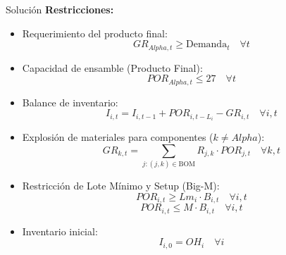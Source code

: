 \documentclass[11pt, a4paper]{article}
\begin{document}
\begin{ejercicio}{Solución}
  \textbf{Restricciones:}
  \begin{itemize}
    \item Requerimiento del producto final:
      \begin{equation}
        GR_{Alpha,t} \ge \text{Demanda}_t \quad \forall t
      \end{equation}
    \item Capacidad de ensamble (Producto Final):
      \begin{equation}
        POR_{Alpha,t} \le 27 \quad \forall t
      \end{equation}
    \item Balance de inventario:
      \begin{equation}
        I_{i,t} = I_{i,t-1} + POR_{i,t-L_i} - GR_{i,t} \quad \forall i, t
      \end{equation}
    \item Explosión de materiales para componentes ($k \ne Alpha$):
      \begin{equation}
        GR_{k,t} = \sum_{j: (j,k) \in \text{BOM}} R_{j,k} \cdot POR_{j,t} \quad \forall k, t
      \end{equation}
    \item Restricción de Lote Mínimo y Setup (Big-M):
      \begin{equation}
        POR_{i,t} \ge Lm_i \cdot B_{i,t} \quad \forall i, t
      \end{equation}
      \begin{equation}
        POR_{i,t} \le M \cdot B_{i,t} \quad \forall i, t
      \end{equation}
    \item Inventario inicial:
      \begin{equation}
        I_{i,0} = OH_i \quad \forall i
      \end{equation}
  \end{itemize}

\end{ejercicio}

\newpage
\end{document}
